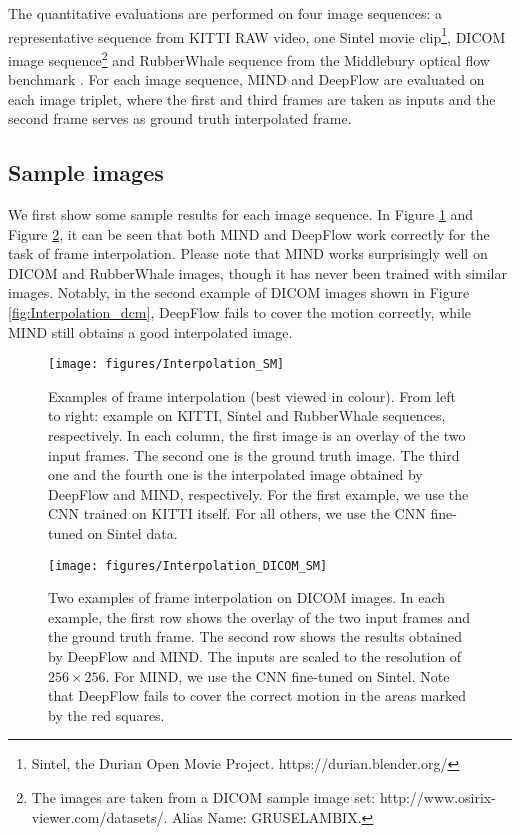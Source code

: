 \documentclass[runningheads]{llncs}
\begin{document}
	The quantitative evaluations are performed on four image sequences: a representative sequence from KITTI RAW video\cite{Geiger2013IJRR}, one Sintel movie clip\footnote{Sintel, the Durian Open Movie Project. https://durian.blender.org/}, DICOM image sequence\footnote{The images are taken from a DICOM sample image set: http://www.osirix-viewer.com/datasets/. Alias Name: GRUSELAMBIX.} and RubberWhale sequence from the Middlebury optical flow benchmark \cite{baker2011database}. For each image sequence, MIND and DeepFlow are evaluated on each image triplet, where the first and third frames are taken as inputs and the second frame serves as ground truth interpolated frame.
	
        \subsection{Sample images}
	
	We first show some sample results for each image sequence. In Figure \ref{fig:Interpolation_examples_SM} and Figure \ref{fig:Interpolation_dcm_SM}, it can be seen that both MIND and DeepFlow work correctly for the task of frame interpolation. Please note that MIND works surprisingly well on DICOM and RubberWhale images, though it has never been trained with similar images. Notably, in the second example of DICOM images shown in Figure \ref{fig:Interpolation_dcm}, DeepFlow fails to cover the motion correctly, while MIND still obtains a good interpolated image.
	
	\begin{figure}[t]
	\centering
	\texttt{[image: figures/Interpolation\_SM]}
	\caption{Examples of frame interpolation (best viewed in colour). From left to right: example on KITTI, Sintel and RubberWhale sequences, respectively. In each column, the first image is an overlay of the two input frames. The second one is the ground truth image. The third one and the fourth one is the interpolated image obtained by DeepFlow and MIND, respectively. For the first example, we use the CNN trained on KITTI itself. For all others, we use the CNN fine-tuned on Sintel data.}
	\label{fig:Interpolation_examples_SM}
	\end{figure}	
	
	\begin{figure}[!t]
		\centering
		\texttt{[image: figures/Interpolation\_DICOM\_SM]}
		\caption{Two examples of frame interpolation on DICOM images. In each example, the first row shows the overlay of the two input frames and the ground truth frame. The second row shows the results obtained by DeepFlow and MIND. The inputs are scaled to the resolution of $256 \times 256 $. For MIND, we use the CNN fine-tuned on Sintel. Note that DeepFlow fails to cover the correct motion in the areas marked by the red squares.}
		\label{fig:Interpolation_dcm_SM}
	\end{figure}
	
\end{document}
